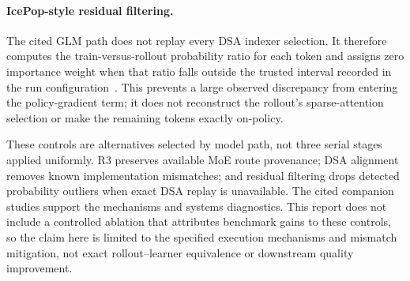 \paragraph{IcePop-style residual filtering.}
The cited GLM path does not replay every DSA indexer selection. It therefore
computes the train-versus-rollout probability ratio for each token and assigns
zero importance weight when that ratio falls outside the trusted interval
recorded in the run configuration~\citep{ling_every_step2025}. This prevents a
large observed discrepancy from entering the policy-gradient term; it does not
reconstruct the rollout's sparse-attention selection or make the remaining
tokens exactly on-policy.

These controls are alternatives selected by model path, not three serial stages
applied uniformly. R3 preserves available MoE route provenance; DSA alignment
removes known implementation mismatches; and residual filtering drops detected
probability outliers when exact DSA replay is unavailable. The cited companion
studies support the mechanisms and systems diagnostics. This report does not
include a controlled \venti{} ablation that attributes benchmark gains to these
controls, so the claim here is limited to the specified execution mechanisms
and mismatch mitigation, not exact rollout--learner equivalence or downstream
quality improvement.

